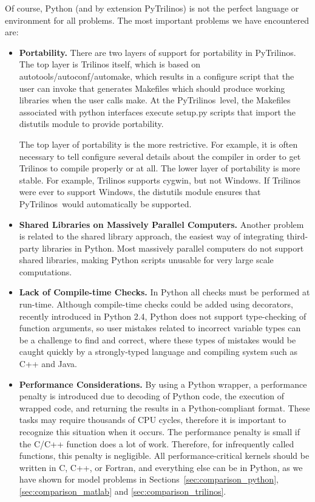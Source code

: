 \documentclass[acmtocl]{acmtrans2m}
\newcommand{\PyTrilinos}{{PyTrilinos}}
\begin{document}
\smallskip

Of course, Python (and by extension \PyTrilinos) is not the perfect
language or environment for all problems.  The most important problems
we have encountered are:

\begin{itemize}

\item {\bf Portability.} There are two layers of support for
  portability in \PyTrilinos.  The top layer is Trilinos itself, which
  is based on autotools/autoconf/automake, which results in a
  configure script that the user can invoke that generates Makefiles
  which should produce working libraries when the user calls make.  At
  the \PyTrilinos\ level, the Makefiles associated with python
  interfaces execute setup.py scripts that import the distutils module
  to provide portability.

  The top layer of portability is the more restrictive.  For example,
  it is often necessary to tell configure several details about the
  compiler in order to get Trilinos to compile properly or at all.
  The lower layer of portability is more stable.  For example,
  Trilinos supports cygwin, but not Windows.  If Trilinos were ever to
  support Windows, the distutils module ensures that
  \PyTrilinos\ would automatically be supported.

\item {\bf Shared Libraries on Massively Parallel Computers.} Another
  problem is related to the shared library approach, the
  easiest way of integrating third-party libraries in Python.  Most
  massively parallel computers do not support shared libraries,
  making Python scripts unusable for very large scale
  computations.

\item {\bf Lack of Compile-time Checks.} In Python all checks must be
  performed at run-time.  Although compile-time checks could be added
  using decorators, recently introduced in Python 2.4, Python does not
  support type-checking of function arguments, so user mistakes
  related to incorrect variable types can be a challenge to find and
  correct, where these types of mistakes would be caught quickly by a
  strongly-typed language and compiling system such as C++ and Java.

\item {\bf Performance Considerations.}  By using a Python wrapper, a
  performance penalty is introduced due to decoding of Python code,
  the execution of wrapped code, and returning the results in a
  Python-compliant format.  These tasks may require thousands of CPU
  cycles, therefore it is important to recognize this situation when
  it occurs.  The performance penalty is small if the C/C++ function
  does a lot of work.  Therefore, for infrequently called functions,
  this penalty is negligible.  All performance-critical kernels should
  be written in C, C++, or Fortran, and everything else can be in
  Python, as we have shown for model problems in
  Sections~\ref{sec:comparison_python}, \ref{sec:comparison_matlab}
  and \ref{sec:comparison_trilinos}.


\end{itemize}
\end{document}
